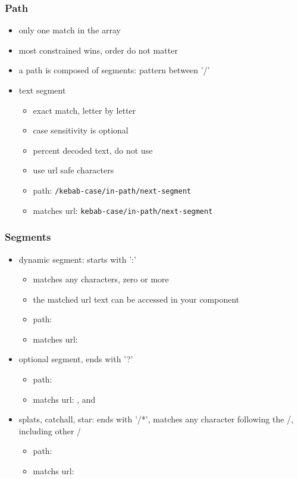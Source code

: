 \begin{frame}[fragile] \frametitle{Path}
\begin{itemize}
  \item only one match in the array
  \item most constrained wins, order do not matter
  \item a path is composed of segments: pattern between '/'
  \item text segment
  \begin{itemize}
    \item exact match, letter by letter
    \item case sensitivity is optional
    \item percent decoded text, do not use 
    \item use url safe characters
    \item path: \texttt{/kebab-case/in-path/next-segment}
    \item matches url: \texttt{kebab-case/in-path/next-segment}
  \end{itemize}
\end{itemize}
\end{frame}

\begin{frame}[fragile] \frametitle{Segments}
\begin{itemize}
  \item dynamic segment: starts with ':'
  \begin{itemize}
    \item matches any characters, zero or more
    \item the matched url text can be accessed in your component
    \item path: 
    \item matches url: 
  \end{itemize}
  \item optional segment, ends with '?'
  \begin{itemize}
    \item path: 
    \item matchs url: , and 
  \end{itemize}
  \item splats, catchall, star: ends with '/*', matches any character following the /, including other /
  \begin{itemize}
    \item path: 
    \item matchs url: 
  \end{itemize}
\end{itemize}
\end{frame}

